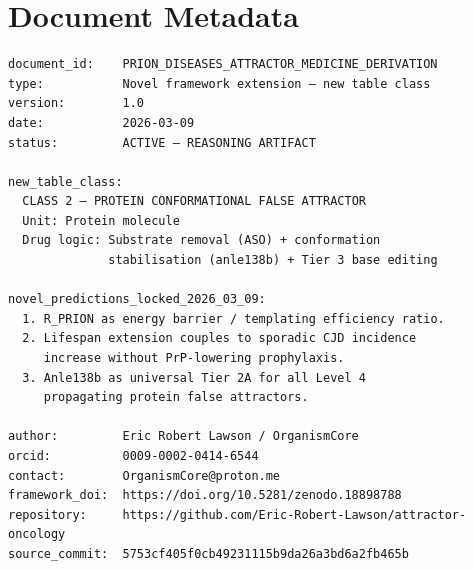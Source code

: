 \documentclass[12pt,a4paper]{article}
\begin{document}
\section*{Document Metadata}

\begin{small}
\begin{verbatim}
document_id:    PRION_DISEASES_ATTRACTOR_MEDICINE_DERIVATION
type:           Novel framework extension — new table class
version:        1.0
date:           2026-03-09
status:         ACTIVE — REASONING ARTIFACT

new_table_class:
  CLASS 2 — PROTEIN CONFORMATIONAL FALSE ATTRACTOR
  Unit: Protein molecule
  Drug logic: Substrate removal (ASO) + conformation
              stabilisation (anle138b) + Tier 3 base editing

novel_predictions_locked_2026_03_09:
  1. R_PRION as energy barrier / templating efficiency ratio.
  2. Lifespan extension couples to sporadic CJD incidence
     increase without PrP-lowering prophylaxis.
  3. Anle138b as universal Tier 2A for all Level 4
     propagating protein false attractors.

author:         Eric Robert Lawson / OrganismCore
orcid:          0009-0002-0414-6544
contact:        OrganismCore@proton.me
framework_doi:  https://doi.org/10.5281/zenodo.18898788
repository:     https://github.com/Eric-Robert-Lawson/attractor-oncology
source_commit:  5753cf405f0cb49231115b9da26a3bd6a2fb465b
\end{verbatim}
\end{small}
\end{document}

